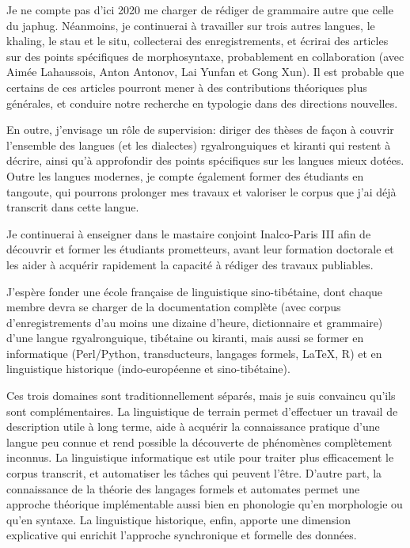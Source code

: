 \documentclass[oldfontcommands,oneside,a4paper,11pt]{article}
\begin{document}
Je ne compte pas d'ici 2020 me charger de rédiger de grammaire autre que celle du japhug. Néanmoins, je continuerai à travailler sur trois autres langues, le khaling, le stau et le situ, collecterai des enregistrements, et écrirai des articles sur des points spécifiques de morphosyntaxe, probablement en collaboration (avec Aimée Lahaussois, Anton Antonov, Lai Yunfan et Gong Xun). Il est probable que certains de ces articles pourront mener à des contributions théoriques plus générales, et conduire notre recherche en typologie dans des directions nouvelles.

En outre, j'envisage un rôle de supervision: diriger des thèses de façon à couvrir l'ensemble des langues (et les dialectes) rgyalronguiques et kiranti qui restent à décrire, ainsi qu'à approfondir des points spécifiques sur les langues mieux dotées. Outre les langues modernes, je compte également former des étudiants en tangoute, qui pourrons prolonger mes travaux et valoriser le corpus que j'ai déjà transcrit dans cette langue. 
 

Je continuerai à enseigner dans le mastaire conjoint Inalco-Paris III afin de découvrir et former les étudiants prometteurs, avant leur formation doctorale et les aider à acquérir rapidement la capacité à rédiger des travaux publiables.

J'espère  fonder une école française de linguistique sino-tibétaine, dont chaque membre devra se charger de la documentation complète (avec corpus d'enregistrements d'au moins une dizaine d'heure, dictionnaire et grammaire) d'une langue rgyalronguique, tibétaine ou  kiranti, mais aussi se former en informatique (Perl/Python, transducteurs, langages formels, \LaTeX, R)  et en linguistique historique (indo-européenne et sino-tibétaine).

Ces trois domaines sont traditionnellement séparés, mais je suis convaincu qu'ils sont complémentaires. La linguistique de terrain permet d'effectuer un travail de description utile à long terme, aide à acquérir la connaissance pratique d'une langue peu connue et rend possible la découverte de phénomènes complètement inconnus. 
 La linguistique informatique est utile pour traiter plus efficacement le corpus transcrit, et automatiser les tâches qui peuvent l'être. D'autre part, la connaissance de la théorie des langages formels et automates permet une approche théorique implémentable  aussi bien en phonologie qu'en morphologie ou qu'en syntaxe.
La linguistique historique, enfin, apporte une dimension explicative qui enrichit l'approche   synchronique et formelle des données.
\end{document}
